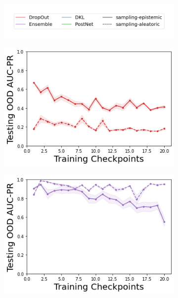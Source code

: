 \begin{figure}
    \centering
        \vspace{-3mm}
    \begin{subfigure}{.45\textwidth}
        \includegraphics[width=\textwidth]{sections/011_icml2022/resources/sampling-legend.png}
    \end{subfigure}
    \vspace{-3mm}
    
    \begin{subfigure}{.245\textwidth}
        \includegraphics[width=\textwidth]{sections/011_icml2022/resources/DropOut-LunarLanderOOD-v0-AUC-PR-out-epistemic_-testing-strategy.png}
    \end{subfigure}
    \begin{subfigure}{.245\textwidth}
        \includegraphics[width=\textwidth]{sections/011_icml2022/resources/Ensemble-LunarLanderOOD-v0-AUC-PR-out-epistemic_-testing-strategy.png}

\end{subfigure}
\end{figure}
